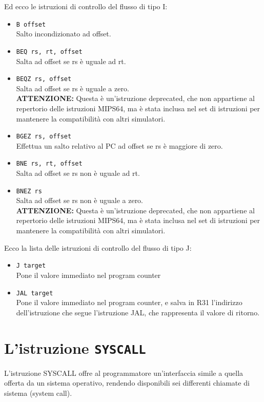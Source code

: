 \documentclass[12pt]{report}
\newcommand{\MS}{MIPS64}
\newcommand{\WARN}{\textbf{ATTENZIONE:} Questa \`{e} un'istruzione deprecated, che
non appartiene al repertorio delle istruzioni \MS{}, ma \`{e} stata inclusa nel set di
istruzioni per mantenere la compatibilit\`{a} con altri simulatori.}
\begin{document}
Ed ecco le istruzioni di controllo del flusso di tipo I:

\begin{itemize}
	\item \texttt{B offset}\\
	Salto incondizionato ad offset.

	\item \texttt{BEQ rs, rt, offset}\\
	Salta ad offset se rs \`{e} uguale ad rt.

	\item \texttt{BEQZ rs, offset}\\
	Salta ad offset se rs \`{e} uguale a zero.\\
	\WARN

	\item \texttt{BGEZ rs, offset}\\
	Effettua un salto relativo al PC ad offset se rs \`e maggiore di zero.

	\item \texttt{BNE rs, rt, offset}\\
	Salta ad offset se rs non \`{e} uguale ad rt.

	\item \texttt{BNEZ rs}\\
	Salta ad offset se rs non \`{e} uguale a zero.\\
	\WARN
\end{itemize}

Ecco la lista delle istruzioni di controllo del flusso di tipo J:

\begin{itemize}
	\item \texttt{J target}\\
	Pone il valore immediato nel program counter

	\item \texttt{JAL target}\\
	Pone il valore immediato nel program counter, e salva in R31 l'indirizzo 
	dell'istruzione che segue l'istruzione JAL, che rappresenta il valore di ritorno.
\end{itemize}

\section{L'istruzione \texttt{SYSCALL}}
\label{sysc-man}
L'istruzione SYSCALL offre al programmatore un'interfaccia simile a quella offerta 
da un sistema operativo, rendendo disponibili sei differenti chiamate di sistema (system call).
\end{document}

